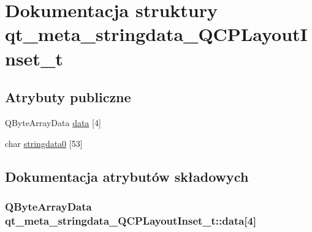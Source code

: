 \hypertarget{structqt__meta__stringdata___q_c_p_layout_inset__t}{}\section{Dokumentacja struktury qt\+\_\+meta\+\_\+stringdata\+\_\+\+Q\+C\+P\+Layout\+Inset\+\_\+t}
\label{structqt__meta__stringdata___q_c_p_layout_inset__t}
\subsection*{Atrybuty publiczne}
\begin{DoxyCompactItemize}
\item 
Q\+Byte\+Array\+Data \hyperlink{structqt__meta__stringdata___q_c_p_layout_inset__t_ae85a598291582d31cc12989c0279ea44}{data} \mbox{[}4\mbox{]}
\item 
char \hyperlink{structqt__meta__stringdata___q_c_p_layout_inset__t_a7cc558fa6388df25517a33006f4a76a2}{stringdata0} \mbox{[}53\mbox{]}
\end{DoxyCompactItemize}


\subsection{Dokumentacja atrybutów składowych}
\subsubsection[{\texorpdfstring{data}{data}}]{\setlength{\rightskip}{0pt plus 5cm}Q\+Byte\+Array\+Data qt\+\_\+meta\+\_\+stringdata\+\_\+\+Q\+C\+P\+Layout\+Inset\+\_\+t\+::data\mbox{[}4\mbox{]}}\hypertarget{structqt__meta__stringdata___q_c_p_layout_inset__t_ae85a598291582d31cc12989c0279ea44}{}\label{structqt__meta__stringdata___q_c_p_layout_inset__t_ae85a598291582d31cc12989c0279ea44}
